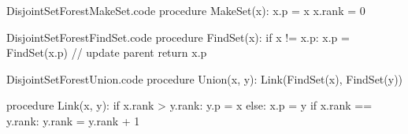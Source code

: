 \documentclass[a4paper]{article}
\begin{document}
\begin{filecontents*}[overwrite]{DisjointSetForestMakeSet.code}
procedure MakeSet(x):
    x.p = x
    x.rank = 0
\end{filecontents*}

\begin{filecontents*}[overwrite]{DisjointSetForestFindSet.code}
procedure FindSet(x):
    if x != x.p:
        x.p = FindSet(x.p)  // update parent
    return x.p
\end{filecontents*}

\begin{filecontents*}[overwrite]{DisjointSetForestUnion.code}
procedure Union(x, y):
    Link(FindSet(x), FindSet(y))

procedure Link(x, y):
    if x.rank > y.rank:
        y.p = x
    else:
        x.p = y
        if x.rank == y.rank:
            y.rank = y.rank + 1
\end{filecontents*}
\end{document}
